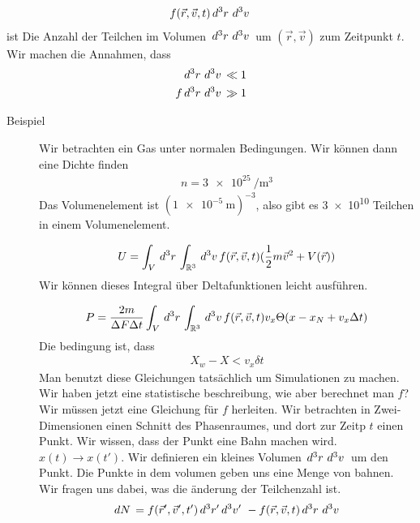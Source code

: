 %
\begin{align*}
  f(\vec{r}, \vec{v}, t) \,d^3 r\, \,d^3 v\,
\end{align*}
%
ist Die Anzahl der Teilchen im Volumen $ \,d^3 r\, \,d^3 v\,$ um
$(\vec{r}, \vec{v})$ zum Zeitpunkt $t$.
Wir machen die Annahmen, dass
%
\begin{align*}
  \,d^3 r\, \,d^3 v\, \ll 1 \\
   f \,d^3 r\, \,d^3 v\, \gg 1 \\
\end{align*}
%
\begin{description}
  \item[Beispiel] Wir betrachten ein Gas unter normalen Bedingungen.
    Wir können dann eine Dichte finden
    \begin{align*}
      n = \SI{3e25}{\per\cubic\metre}
    \end{align*}
    Das Volumenelement ist $( \SI{1e-5}{\metre})^{-3}$, also gibt es
    \SI{3e10}{} Teilchen in einem Volumenelement.

    \begin{align*}
      U = \int_{V}^{} \,d^3 r\, \int_{\mathbb{R}^3}^{} \,d^3 v\, f(\vec{r}, \vec{v}, t)
      (\frac{1}{2} m \vec{v}^2 + V (\vec{r}))
    \end{align*}
    Wir können dieses Integral über Deltafunktionen leicht ausführen.

    \begin{align*}
      P = \frac{2 m}{ \Delta F \Delta t} \int_{V}^{} \,d^3 r\, \int_{\mathbb{R}^3}^{} \,d^3 v\,
      f(\vec{r}, \vec{v}, t) v_x \Theta(x - x_N + v_x \Delta t)
    \end{align*}
    Die bedingung ist, dass
    \begin{align*}
      X_w - X < v_x \delta t
    \end{align*}
    Man benutzt diese Gleichungen tatsächlich um Simulationen zu machen.
    Wir haben jetzt eine statistische beschreibung, wie aber berechnet
    man $f$? Wir müssen jetzt eine Gleichung für $f$ herleiten.
    Wir betrachten in Zwei-Dimensionen einen Schnitt des Phasenraumes,
    und dort zur Zeitp $t$ einen Punkt. Wir wissen, dass der Punkt eine
    Bahn machen wird. $x(t) \to x(t')$. Wir definieren ein kleines Volumen
    $ \,d^3 r\, \,d^3 v\,$ um den Punkt. Die Punkte in dem volumen geben uns
    eine Menge von bahnen. Wir fragen uns dabei, was die änderung
    der Teilchenzahl ist.
    \begin{align*}
      \,dN\, = f(\vec{r}', \vec{v}', t') \,d^3 r ' \,d^3 v'\,\, -
      f(\vec{r}, \vec{v}, t) \,d^3 r\, \,d^3 v\,
    \end{align*}


\end{description}
